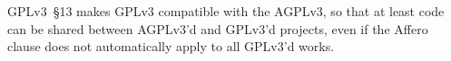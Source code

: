 GPLv3~\S13 makes GPLv3 compatible with the AGPLv3, so that at least code can
be shared between AGPLv3'd and GPLv3'd projects, even if the Affero clause
does not automatically apply to all GPLv3'd works.





